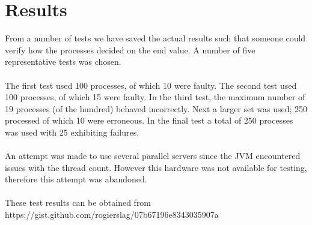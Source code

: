 \documentclass[a4paper]{IEEEtran}
\begin{document}
\section{Results}

From a number of tests we have saved the actual results such that someone could verify how the processes decided on the end value.
A number of five representative tests was chosen.
\\
\\
The first test used 100 processes, of which 10 were faulty.
The second test used 100 processes, of which 15 were faulty.
In the third test, the maximum number of 19 processes (of the hundred) behaved incorrectly.
Next a larger set was used; 250 processed of which 10 were erroneous.
In the final test a total of 250 processes was used with 25 exhibiting failures.
\\
\\
An attempt was made to use several parallel servers since the JVM encountered issues with the thread count.
However this hardware was not available for testing, therefore this attempt was abandoned.
\\
\\
These test results can be obtained from https://gist.github.com/rogierslag/07b67196e8343035907a
\end{document}
